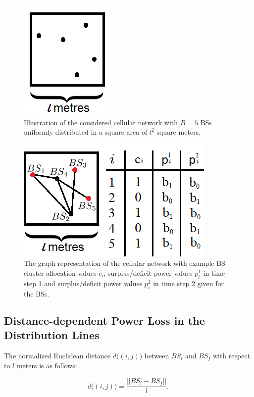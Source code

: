 \begin{figure}[H]
\centering 
\includegraphics[width=0.3\columnwidth]{pictures/square4}
\caption[Illustration of the considered cellular network]{Illustration of the considered cellular network with $B=5$ BSs uniformly distributed in a square area of $l^2$ square meters. \label{fig:1}}
\end{figure}


\begin{figure}[H]
\centering 
\includegraphics[width=0.6\columnwidth]{pictures/square6}
\caption[The graph representation of the cellular network]{The graph representation of the cellular network with example BS cluster allocation values $c_i$, surplus/deficit power values $p_i^1$ in time step 1 and surplus/deficit power values $p_i^2$ in time step 2 given for the BSs.\label{fig:2}\label{area}}
\end{figure}

\subsection{Distance-dependent Power Loss in the Distribution Lines}
The normalized Euclidean distance $d\big((i,j)\big)$ between $BS_i$ and $BS_j$ with respect to $l$ meters is as follows:


\begin{equation}\label{equ_y}
d\big((i,j)\big)=\frac{||BS_i-BS_j||}{l},
\end{equation}





